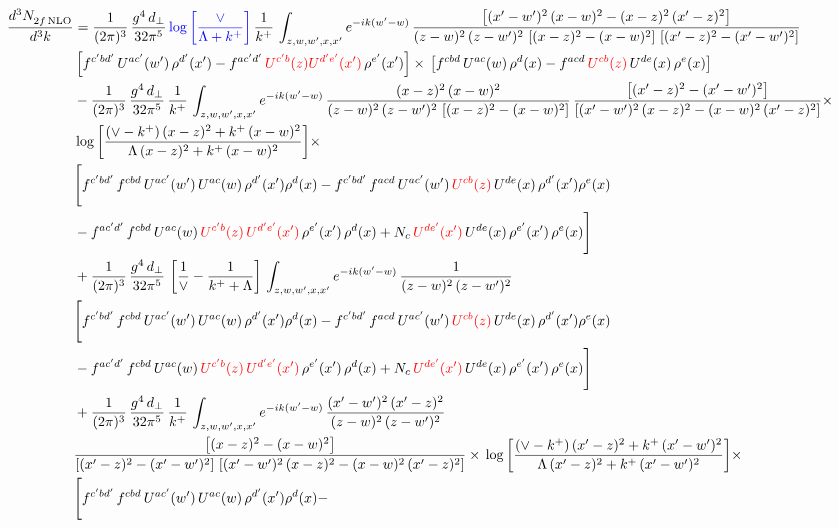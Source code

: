 \documentclass[9pt]{article}
\numberwithin{equation}{section}
\begin{document}
\begin{align}
    \frac{d^{3}N_{2f\,\rm NLO}^{\rm}}{d^{3}k}  & = \frac{1}{(2\pi)^{3}}\, \frac{g^{4}\,d_{\perp}}{32\pi^{5}}\,{\color{blue}\log{\left[\frac{\vee}{\Lambda + k^{+}}\right]}}\,\frac{1}{k^{+}}\,\int_{z,w,w^{\prime},x,x'} e^{-ik(w^{\prime}-w)}\,\frac{\left[(x'-w')^{2}\, (x-w)^{2} - (x-z)^{2}\, (x'-z)^{2}\right]}{(z-w)^{2}\, (z-w')^{2}\,\left[(x-z)^{2} - (x-w)^{2}\right]\, \left[(x'-z)^{2} - (x'-w')^{2}\right]}\notag \\ &   \left[f^{c'bd'}\, U^{ac'}(w')\,\rho^{d'}(x')-f^{ac'd'}\, {\color{red}U^{c'b}(z)U^{d'e'}(x')}\, \rho^{e'}(x')\right]\times\, \left[f^{cbd}\, U^{ac}(w)\,\rho^{d}(x) - f^{acd}\, {\color{red}U^{cb}(z)}\,U^{de}(x)\, \rho^{e}(x)\right] \notag \\ & - \frac{1}{(2\pi)^{3}}\, \frac{g^{4}\,d_{\perp}}{32\pi^{5}}\,\frac{1}{k^{+}}\,\int_{z,w,w^{\prime},x,x'} e^{-ik(w^{\prime}-w)}\,\frac{(x-z)^{2}\, (x-w)^{2}}{(z-w)^{2}\, (z-w')^{2}\,\left[(x-z)^{2} - (x-w)^{2}\right]}\,\frac{\left[(x'-z)^{2}-(x'-w')^{2}\right]}{\left[(x'-w')^{2}\, (x-z)^{2} - (x-w)^{2}\, (x'-z)^{2}\right]}\times\notag \\ & \log{\left[\frac{(\vee - k^{+})\, (x-z)^{2} + k^{+}\, (x-w)^{2}}{\Lambda\, (x-z)^{2} + k^{+}\, (x-w)^{2}}\right]}\times\notag \\ & \Bigg[f^{c'bd'}\,f^{cbd}\, U^{ac'}(w')\,U^{ac}(w)\,\rho^{d'}(x')\rho^{d}(x)- f^{c'bd'}\,f^{acd}\,U^{ac'}(w')\,{\color{red}U^{cb}(z)}\,U^{de}(x)\,\rho^{d'}(x')\rho^{e}(x) \notag \\ & -f^{ac'd'}\,f^{cbd}\,U^{ac}(w)\,{\color{red}U^{c'b}(z)\,U^{d'e'}(x')}\,\rho^{e'}(x')\,\rho^{d}(x) +N_{c}\,{\color{red}U^{de'}(x')}\,U^{de}(x)\,\rho^{e'}(x')\,\rho^{e}(x)\Bigg] \notag \\ & + \frac{1}{(2\pi)^{3}}\, \frac{g^{4}\,d_{\perp}}{32\pi^{5}}\,\left[\frac{1}{\vee} - \frac{1}{k^{+} + \Lambda}\right]\,\int_{z,w,w^{\prime},x,x'} e^{-ik(w^{\prime}-w)}\,\frac{1}{(z-w)^{2}\, (z-w')^{2}}\notag \\ & \Bigg[f^{c'bd'}\,f^{cbd}\, U^{ac'}(w')\,U^{ac}(w)\,\rho^{d'}(x')\rho^{d}(x)- f^{c'bd'}\,f^{acd}\,U^{ac'}(w')\,{\color{red}U^{cb}(z)}\,U^{de}(x)\,\rho^{d'}(x')\rho^{e}(x) \notag \\ & -f^{ac'd'}\,f^{cbd}\,U^{ac}(w)\,{\color{red}U^{c'b}(z)\,U^{d'e'}(x')}\,\rho^{e'}(x')\,\rho^{d}(x) +N_{c}\,{\color{red}U^{de'}(x')}\,U^{de}(x)\,\rho^{e'}(x')\,\rho^{e}(x)\Bigg] \notag \\ & + \frac{1}{(2\pi)^{3}}\, \frac{g^{4}\,d_{\perp}}{32\pi^{5}}\,\frac{1}{k^{+}}\,\int_{z,w,w^{\prime},x,x'} e^{-ik(w^{\prime}-w)}\,\frac{(x'-w')^{2}\, (x'-z)^{2}}{(z-w)^{2}\, (z-w')^{2}}\notag \\ & \frac{\left[(x-z)^{2} - (x-w)^{2}\right]}{\left[(x'-z)^{2} - (x'-w')^{2}\right]\, \left[(x'-w')^{2}\, (x - z)^{2} - (x-w)^{2}\,(x'-z)^{2}\right]}\times\, \log{\left[\frac{(\vee - k^{+})\, (x'-z)^{2} + k^{+}\, (x'-w')^{2}}{\Lambda\, (x'-z)^{2} + k^{+}\, (x'-w')^{2}}\right]}\times \notag \\ &  \Bigg[f^{c'bd'}\,f^{cbd}\, U^{ac'}(w')\,U^{ac}(w)\,\rho^{d'}(x')\rho^{d}(x)- 
\end{align}
\end{document}
